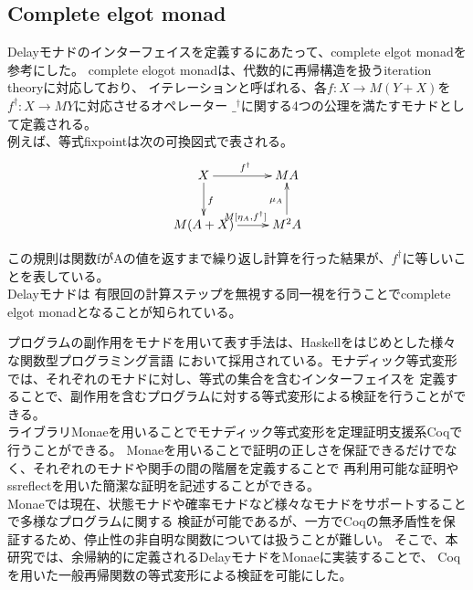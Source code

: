\documentclass[japanese]{jssst_ppl}
\theoremstyle{definition}
\begin{document}
\subsection{Complete elgot monad}
Delayモナドのインターフェイスを定義するにあたって、complete elgot monad\cite{ADAMEK20101306}を参考にした。
complete elogot monadは、代数的に再帰構造を扱うiteration theory\cite{1993Bloom}に対応しており、
イテレーションと呼ばれる、各$f : X \rightarrow M (Y + X)$を$f^{\dagger} : X \rightarrow M Y$に対応させるオペレーター
$\_^{\dagger}$に関する4つの公理を満たすモナドとして定義される。\\
例えば、等式fixpointは次の可換図式で表される。
\xymatrixcolsep{2.5cm}
\[
  \xymatrix{
  X \ar[r]^{f^{\dagger}} \ar[d]^{f} & M A  \\
  M (A + X) \ar[r]^{M[\eta_A, f^{\dagger}]}  & M^2 A \ar[u]^{\mu_A}
  }
\]

この規則は関数fがAの値を返すまで繰り返し計算を行った結果が、$f^{\dagger}$に等しいことを表している。\\

Delayモナドは
有限回の計算ステップを無視する同一視を行うことでcomplete elgot monadとなることが知られている\cite{10.1007/978-3-319-67729-3_3}。







\iffalse
  プログラムの副作用をモナドを用いて表す手法は、Haskellをはじめとした様々な関数型プログラミング言語
  において採用されている。モナディック等式変形では、それぞれのモナドに対し、等式の集合を含むインターフェイスを
  定義することで、副作用を含むプログラムに対する等式変形による検証を行うことができる。\\
  ライブラリMonaeを用いることでモナディック等式変形を定理証明支援系Coqで行うことができる。
  Monaeを用いることで証明の正しさを保証できるだけでなく、それぞれのモナドや関手の間の階層を定義することで
  再利用可能な証明やssreflectを用いた簡潔な証明を記述することができる。\\
  Monaeでは現在、状態モナドや確率モナドなど様々なモナドをサポートすることで多様なプログラムに関する
  検証が可能であるが、一方でCoqの無矛盾性を保証するため、停止性の非自明な関数については扱うことが難しい。
  そこで、本研究では、余帰納的に定義されるDelayモナドをMonaeに実装することで、
  Coqを用いた一般再帰関数の等式変形による検証を可能にした。
\end{document}
